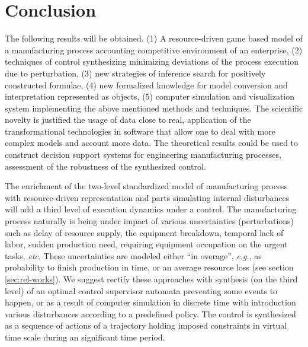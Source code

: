\documentclass[runningheads]{llncs}
\begin{document}
\section*{Conclusion}
\label{sec:conc}

The following results will be obtained. (1) A resource-driven game based model of a manufacturing process accounting competitive environment of an enterprise, (2) techniques of control synthesizing minimizing deviations of the process execution due to perturbation, (3) new strategies of inference search for positively constructed formulae, (4) new formalized knowledge for model conversion and interpretation represented as objects, (5) computer simulation and visualization system implementing the above mentioned methods and techniques. The scientific novelty is justified the usage of data close to real, application of the transformational technologies in software that allow one to deal with more complex models and account more data.
The theoretical results could be used to construct decision support systems for engineering manufacturing processes, assessment of the robustness of the synthesized control.

The enrichment of the two-level standardized model of manufacturing process with resource-driven representation and parts simulating internal disturbances will add a third level of execution dynamics under a control.  The manufacturing process naturally is being under impact of various uncertainties (perturbations) such as delay of resource supply, the equipment breakdown, temporal lack of labor, sudden production need, requiring equipment occupation on the urgent tasks, \emph{etc}. These uncertainties are modeled either “in overage”, \emph{e.g.}, as probability to finish production in time, or an average resource loss (see section \ref{sec:rel-works}).  We suggest rectify these approaches with synthesis (on the third level) of an optimal control supervisor automata preventing some events to happen, or as a result of computer simulation in discrete time with introduction various disturbances according to a predefined policy. The control is synthesized as a sequence of actions of a trajectory holding imposed constraints in virtual time scale during an significant time period.
\end{document}

